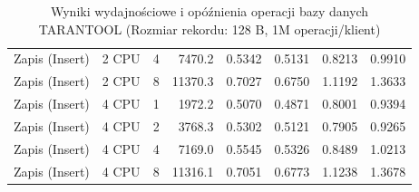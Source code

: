 \begin{table}[ht]
{\begin{tabular}{llcrrrrr}
Zapis (Insert) & 2 CPU & 4 & 7470.2 & 0.5342 & 0.5131 & 0.8213 & 0.9910 \\
Zapis (Insert) & 2 CPU & 8 & 11370.3 & 0.7027 & 0.6750 & 1.1192 & 1.3633 \\
Zapis (Insert) & 4 CPU & 1 & 1972.2 & 0.5070 & 0.4871 & 0.8001 & 0.9394 \\
Zapis (Insert) & 4 CPU & 2 & 3768.3 & 0.5302 & 0.5121 & 0.7905 & 0.9265 \\
Zapis (Insert) & 4 CPU & 4 & 7169.0 & 0.5545 & 0.5326 & 0.8489 & 1.0213 \\
Zapis (Insert) & 4 CPU & 8 & 11316.1 & 0.7051 & 0.6773 & 1.1238 & 1.3678 \\
\bottomrule
\end{tabular}%
}
\caption{Wyniki wydajnościowe i opóźnienia operacji bazy danych TARANTOOL (Rozmiar rekordu: 128 B, 1M operacji/klient)}
\label{tab:latency_tarantool_small_1000000}
\end{table}
